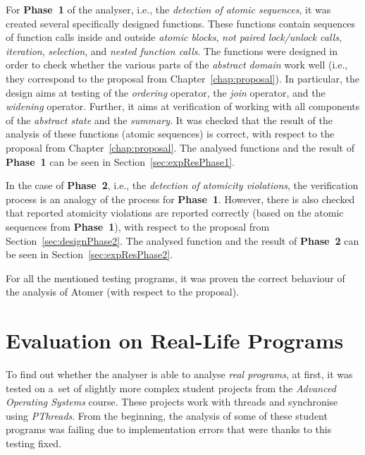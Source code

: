 For \textbf{Phase~1} of the analyser, i.e., the \emph{detection of
atomic sequences}, it was created several specifically designed functions.
These functions contain sequences of function calls inside
and outside \emph{atomic blocks}, \emph{not paired lock/unlock calls},
\emph{iteration}, \emph{selection}, and \emph{nested function calls}.
The functions were designed in order to check whether the various parts of
the \emph{abstract domain} work well (i.e., they correspond to the proposal
from Chapter~\ref{chap:proposal}). In particular, the design aims at
testing of the \emph{ordering} operator, the \emph{join} operator,
and the \emph{widening} operator. Further, it aims at verification of
working with all components of the \emph{abstract state} and the
\emph{summary}. It was checked that the result of the analysis
of these functions (atomic sequences) is correct, with respect to
the proposal from Chapter~\ref{chap:proposal}. The analysed functions
and the result of \textbf{Phase~1} can be seen in
Section~\ref{sec:expResPhase1}.

In the case of \textbf{Phase~2}, i.e., the \emph{detection of atomicity
violations}, the verification process is an analogy of the process
for \textbf{Phase~1}. However, there is also checked that reported
atomicity violations are reported correctly (based on the atomic sequences
from \textbf{Phase~1}), with respect to the proposal from
Section~\ref{sec:designPhase2}. The analysed function and the result
of \textbf{Phase~2} can be seen in Section~\ref{sec:expResPhase2}.

For all the mentioned testing programs, it was proven the correct behaviour
of the analysis of Atomer (with respect to the proposal).


\section{Evaluation on Real-Life Programs}
\label{sec:expReal}

To find out whether the analyser is able to analyse \emph{real programs},
at first, it was tested on a~set of slightly more complex student
projects from the \emph{Advanced Operating Systems} course. These projects
work with threads and synchronise using \emph{PThreads}. From the beginning,
the analysis of some of these student programs was failing due to
implementation errors that were thanks to this testing fixed.

